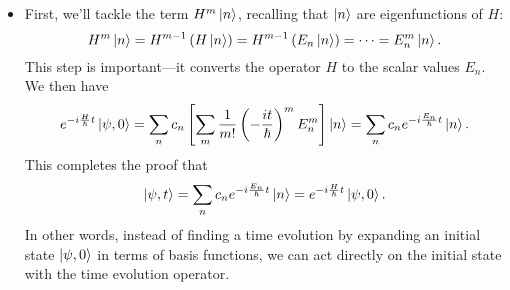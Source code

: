 \documentclass[11pt, a4paper]{article}
\begin{document}
\begin{itemize}
	\item First, we'll tackle the term $ H^{m}\ket{n} $, recalling that $ \ket{n} $ are eigenfunctions of $ H $:
	\begin{equation*}
		H^{m}\ket{n} = H^{m-1}\left(H\ket{n}\right) = H^{m-1}\left(E_{n}\ket{n}\right) = \cdots = E_{n}^{m}\ket{n}.
	\end{equation*}
	This step is important---it converts the operator $ H $ to the scalar values $ E_{n} $. We then have
	\begin{equation*}
		e^{-i\frac{H}{\hbar}t}\ket{\psi, 0} = \sum_{n}c_{n} \left[\sum_{m}\frac{1}{m!}\left (-\frac{it}{\hbar}\right )^{m}E_{n}^{m}\right]\ket{n} = \sum_{n}c_{n}e^{-i\frac{E_{n}}{\hbar}t}\ket{n}.
	\end{equation*}
	This completes the proof that
	\begin{equation*}
		\ket{\psi, t} = \sum_{n} c_{n}e^{-i \frac{E_{n}}{\hbar}t}\ket{n} = e^{-i\frac{H}{\hbar}t}\ket{\psi, 0}.
	\end{equation*} 
	In other words, instead of finding a time evolution by expanding an initial state $ \ket{\psi, 0} $ in terms of basis functions, we can act directly on the initial state with the time evolution operator.
\end{itemize}
\end{document}
